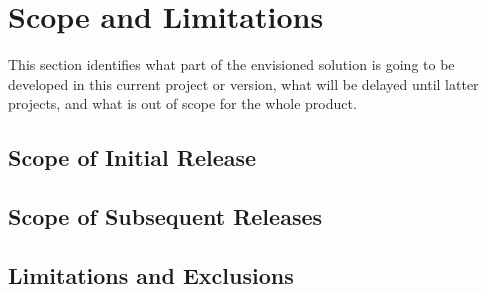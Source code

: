 \section{Scope and Limitations}
This section identifies what part of the envisioned solution is going to be
developed in this current project or version, what will be delayed until
latter projects, and what is out of scope for the whole product.  

\subsection{Scope of Initial Release}
\subsection{Scope of Subsequent Releases}
\subsection{Limitations and Exclusions}
